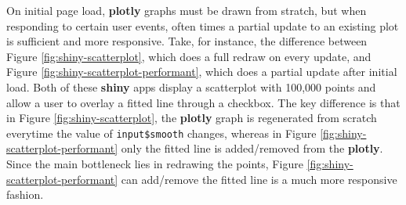 \documentclass[
  12pt,
]{krantz}
\begin{document}
On initial page load, \textbf{plotly} graphs must be drawn from stratch, but when responding to certain user events, often times a partial update to an existing plot is sufficient and more responsive. Take, for instance, the difference between Figure \ref{fig:shiny-scatterplot}, which does a full redraw on every update, and Figure \ref{fig:shiny-scatterplot-performant}, which does a partial update after initial load. Both of these \textbf{shiny} apps display a scatterplot with 100,000 points and allow a user to overlay a fitted line through a checkbox. The key difference is that in Figure \ref{fig:shiny-scatterplot}, the \textbf{plotly} graph is regenerated from scratch everytime the value of \texttt{input\$smooth} changes, whereas in Figure \ref{fig:shiny-scatterplot-performant} only the fitted line is added/removed from the \textbf{plotly}. Since the main bottleneck lies in redrawing the points, Figure \ref{fig:shiny-scatterplot-performant} can add/remove the fitted line is a much more responsive fashion.
\end{document}

